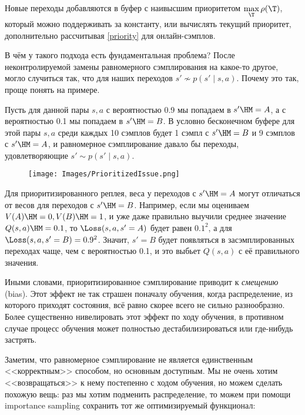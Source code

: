 \begin{remark}
Новые переходы добавляются в буфер с наивысшим приоритетом $\max\limits_{\T } \rho(\T )$, который можно поддерживать за константу, или вычислять текущий приоритет, дополнительно рассчитывая \eqref{priority} для онлайн-сэмплов.
\end{remark}

В чём у такого подхода есть фундаментальная проблема? После неконтролируемой замены равномерного сэмплирования на какое-то другое, могло случиться так, что для наших переходов $s' \not\sim p(s' \mid s, a)$. Почему это так, проще понять на примере.

\begin{example}
Пусть для данной пары $s, a$ с вероятностью 0.9 мы попадаем в $s' \HM= A$, а с вероятностью 0.1 мы попадаем в $s' \HM= B$. В условно бесконечном буфере для этой пары $s, a$ среди каждых 10 сэмплов будет 1 сэмпл с $s' \HM= B$ и 9 сэмплов с $s' \HM= A$, и равномерное сэмплирование давало бы переходы, удовлетворяющие $s' \sim p(s' \mid s, a)$. 

\begin{wrapfigure}{r}{0.15\textwidth}
\vspace{-0.3cm}
\centering
\texttt{[image: Images/PrioritizedIssue.png]}
\end{wrapfigure}

Для приоритизированного реплея, веса у переходов с $s' \HM= A$ могут отличаться от весов для переходов с $s' \HM= B$. Например, если мы оцениваем $V(A) \HM= 0, V(B) \HM= 1$, и уже даже правильно выучили среднее значение $Q(s, a) \HM= 0.1$, то $\Loss(s, a, s'=A)$ будет равен $0.1^2$, а для $\Loss(s, a, s'=B) = 0.9^2$. Значит, $s' = B$ будет появляться в засэмплированных переходах чаще, чем с вероятностью 0.1, и это выбьет $Q(s, a)$ с её правильного значения.
\end{example}

Иными словами, приоритизированное сэмплирование приводит к \emph{смещению} (bias). Этот эффект не так страшен поначалу обучения, когда распределение, из которого приходят состояния, всё равно скорее всего не сильно разнообразно. Более существенно нивелировать этот эффект по ходу обучения, в противном случае процесс обучения может полностью дестабилизироваться или где-нибудь застрять.

Заметим, что равномерное сэмплирование не является единственным <<корректным>> способом, но основным доступным. Мы не очень хотим <<возвращаться>> к нему постепенно с ходом обучения, но можем сделать похожую вещь: раз мы хотим подменить распределение, то можем при помощи importance sampling сохранить тот же оптимизируемый функционал:

